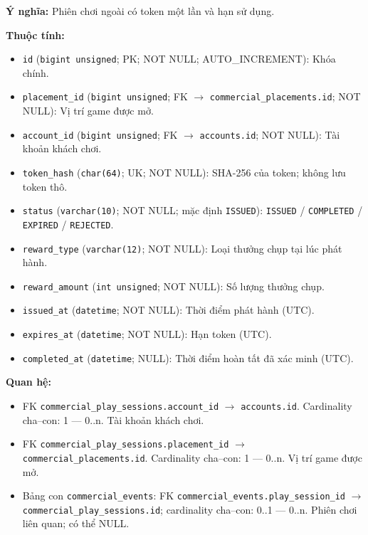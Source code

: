 \textbf{Ý nghĩa:} Phiên chơi ngoài có token một lần và hạn sử dụng.\par

\textbf{Thuộc tính:}

\begin{itemize}

\item \texttt{id} (\texttt{bigint unsigned}; PK; NOT NULL; AUTO_INCREMENT): Khóa chính.

\item \texttt{placement\_id} (\texttt{bigint unsigned}; FK $\rightarrow$ \texttt{commercial\_placements.id}; NOT NULL): Vị trí game được mở.

\item \texttt{account\_id} (\texttt{bigint unsigned}; FK $\rightarrow$ \texttt{accounts.id}; NOT NULL): Tài khoản khách chơi.

\item \texttt{token\_hash} (\texttt{char(64)}; UK; NOT NULL): SHA-256 của token; không lưu token thô.

\item \texttt{status} (\texttt{varchar(10)}; NOT NULL; mặc định \texttt{ISSUED}): \texttt{ISSUED} / \texttt{COMPLETED} / \texttt{EXPIRED} / \texttt{REJECTED}.

\item \texttt{reward\_type} (\texttt{varchar(12)}; NOT NULL): Loại thưởng chụp tại lúc phát hành.

\item \texttt{reward\_amount} (\texttt{int unsigned}; NOT NULL): Số lượng thưởng chụp.

\item \texttt{issued\_at} (\texttt{datetime}; NOT NULL): Thời điểm phát hành (UTC).

\item \texttt{expires\_at} (\texttt{datetime}; NOT NULL): Hạn token (UTC).

\item \texttt{completed\_at} (\texttt{datetime}; NULL): Thời điểm hoàn tất đã xác minh (UTC).

\end{itemize}

\textbf{Quan hệ:}

\begin{itemize}

\item FK \texttt{commercial\_play\_sessions.account\_id} $\rightarrow$ \texttt{accounts.id}. Cardinality cha--con: 1 — 0..n. Tài khoản khách chơi.

\item FK \texttt{commercial\_play\_sessions.placement\_id} $\rightarrow$ \texttt{commercial\_placements.id}. Cardinality cha--con: 1 — 0..n. Vị trí game được mở.

\item Bảng con \texttt{commercial\_events}: FK \texttt{commercial\_events.play\_session\_id} $\rightarrow$ \texttt{commercial\_play\_sessions.id}; cardinality cha--con: 0..1 — 0..n. Phiên chơi liên quan; có thể NULL.

\end{itemize}

